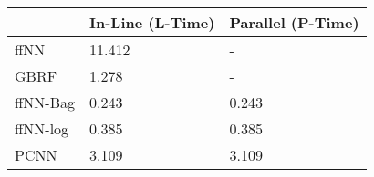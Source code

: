 \begin{tabular}{lll}
\toprule
{} & In-Line (L-Time) & Parallel (P-Time) \\
\midrule
ffNN     &           11.412 &                 - \\
GBRF     &            1.278 &                 - \\
ffNN-Bag &            0.243 &             0.243 \\
ffNN-log &            0.385 &             0.385 \\
PCNN     &            3.109 &             3.109 \\
\bottomrule
\end{tabular}
